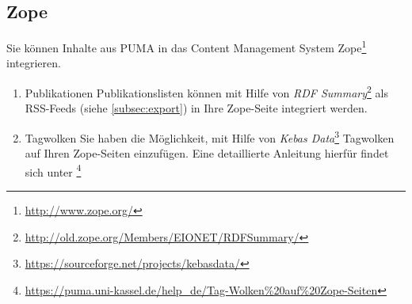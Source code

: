 \subsection{Zope}
\label{subsec:zope}
Sie können Inhalte aus PUMA in das Content Management System Zope\footnote{\url{http://www.zope.org/}} integrieren.
\begin{enumerate}
    \item Publikationen\newline
    Publikationslisten können mit Hilfe von \textit{RDF Summary}\footnote{\url{http://old.zope.org/Members/EIONET/RDFSummary/}} als RSS-Feeds (siehe \autoref{subsec:export}) in Ihre Zope-Seite integriert werden. 
    \item Tagwolken\newline
    Sie haben die Möglichkeit, mit Hilfe von \textit{Kebas Data}\footnote{\url{https://sourceforge.net/projects/kebasdata/}} Tagwolken auf Ihren Zope-Seiten einzufügen. Eine detaillierte Anleitung hierfür findet sich unter \footnote{\url{https://puma.uni-kassel.de/help_de/Tag-Wolken\%20auf\%20Zope-Seiten}}
\end{enumerate}
%  
%
